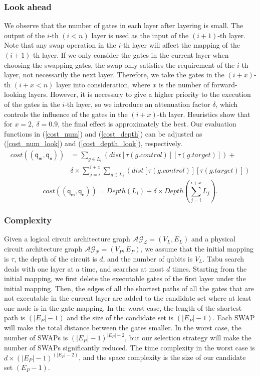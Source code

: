 \documentclass[journal]{IEEEtran}
\begin{document}
\subsubsection{Look ahead }
We observe that the number of gates in each layer after layering is small. The output of the $i$-th $(i<n)$ layer is used as the input of the $(i+1)$-th layer. Note that any swap operation in the $i$-th layer will affect the mapping of the $(i+1)$-th layer. If we only consider the gates in the current layer when choosing the swapping gates, the swap only satisfies the requirement of the $i$-th layer, not necessarily the next layer. Therefore, we take the gates in the $(i+x)$-th $(i+x<n)$ layer into consideration, where $x$ is the number of forward-looking layers. However, it is necessary to give a higher priority to the execution of the gates in the $i$-th layer, so we introduce an attenuation factor $\delta$, which controls the influence of the gates in the $(i+x)$-th layer. Heuristics show that for $x=2,\ \delta=0.9$, the final effect is  approximately the best. Our evaluation functions in (\ref{cost_num}) and  (\ref{cost_depth}) can be adjusted as
(\ref{cost_num_look}) and  (\ref{cost_depth_look}), respectively.
 \begin{equation}
	 	\begin{aligned}
			cost((\textsf{q}_\textsf{m},\textsf{q}_\textsf{n}))&=\sum_{g \in L_{i}}(dist[\tau(g.control)][\tau(g.target)])+\\
	&\delta \times \sum_{j=i}^{i+x}\sum_{g \in L_{j}}(dist[\tau(g.control)][\tau(g.target)])
	\label{cost_num_look}
	\end{aligned}
 \end{equation}
	\begin{equation}
		cost((\textsf{q}_\textsf{m},\textsf{q}_\textsf{n}))= Depth(L_{i})+\delta \times Depth(\sum_{j=i}^{i+x}L_{j}).
		\label{cost_depth_look}
		\end{equation}
\subsubsection{Complexity}
Given a logical circuit architecture graph  $\mathcal{AG_{L}}=(V_{L},E_{L})$ and a physical circuit architecture graph $\mathcal{AG_{P}}=(V_{P},E_{P})$, we assume that the initial mapping is $\tau$, the depth of the circuit is $d$, and the number of qubits is $V_{L}$. Tabu search deals with one layer at a time, and searches at most $d$ times. Starting from the initial mapping, we first delete the executable gates of the first layer under the initial mapping. Then, the edges of all the shortest paths of all the gates that are not executable in the current layer are added to the candidate set where at least one node is in the gate mapping. In the worst case, the length of the shortest path  is $(|E_{P}|-1)$
and the size of the candidate set  is $(|E_{P}|-1)$. Each SWAP will make the total distance between the gates smaller. In the worst case, the number of SWAPs is $(|E_{P}|-1)^{|E_{P}|-2}$, but our selection strategy will make the number of SWAPs significantly reduced. The time complexity in the worst case is $d\times (|E_{P}|-1)^{(|E_{P}|-2)}$, and the space complexity is the size of our candidate set $(E_{P}-1)$.
\end{document}
